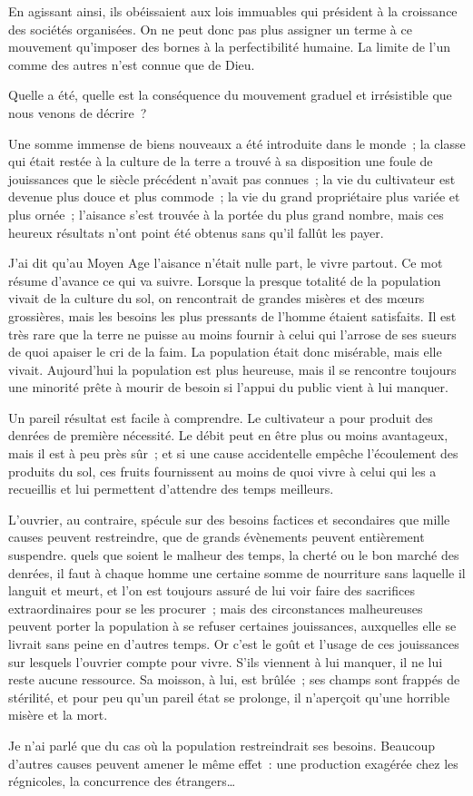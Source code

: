 \documentclass[twoside]{book} %
\begin{document}
\noindent En agissant ainsi, ils obéissaient aux lois immuables qui président à la croissance des sociétés organisées. On ne peut donc pas plus assigner un terme à ce mouvement qu’imposer des bornes à la perfectibilité humaine. La limite de l’un comme des autres n’est connue que de Dieu.\par
Quelle a été, quelle est la conséquence du mouvement graduel et irrésistible que nous venons de décrire ?\par
Une somme immense de biens nouveaux a été introduite dans le monde ; la classe qui était restée à la culture de la terre a trouvé à sa disposition une foule de jouissances que le siècle précédent n’avait pas connues ; la vie du cultivateur est devenue plus douce et plus commode ; la vie du grand propriétaire plus variée et plus ornée ; l’aisance s’est trouvée à la portée du plus grand nombre, mais ces heureux résultats n’ont point été obtenus sans qu’il fallût les payer.\par
J'ai dit qu’au Moyen Age l’aisance n’était nulle part, le vivre partout. Ce mot résume d’avance ce qui va suivre. Lorsque la presque totalité de la population vivait de la culture du sol, on rencontrait de grandes misères et des mœurs grossières, mais les besoins les plus pressants de l’homme étaient satisfaits. Il est très rare que la terre ne puisse au moins fournir à celui qui l’arrose de ses sueurs de quoi apaiser le cri de la faim. La population était donc misérable, mais elle vivait. Aujourd’hui la population est plus heureuse, mais il se rencontre toujours une minorité prête à mourir de besoin si l’appui du public vient à lui manquer.\par
Un pareil résultat est facile à comprendre. Le cultivateur a pour produit des denrées de première nécessité. Le débit peut en être plus ou moins avantageux, mais il est à peu près sûr ; et si une cause accidentelle empêche l’écoulement des produits du sol, ces fruits fournissent au moins de quoi vivre à celui qui les a recueillis et lui permettent d’attendre des temps meilleurs.\par
L'ouvrier, au contraire, spécule sur des besoins factices et secondaires que mille causes peuvent restreindre, que de grands évènements peuvent entièrement suspendre. quels que soient le malheur des temps, la cherté ou le bon marché des denrées, il faut à chaque homme une certaine somme de nourriture sans laquelle il languit et meurt, et l’on est toujours assuré de lui voir faire des sacrifices extraordinaires pour se les procurer ; mais des circonstances malheureuses peuvent porter la population à se refuser certaines jouissances, auxquelles elle se livrait sans peine en d’autres temps. Or c’est le goût et l’usage de ces jouissances sur lesquels l’ouvrier compte pour vivre. S'ils viennent à lui manquer, il ne lui reste aucune ressource. Sa moisson, à lui, est brûlée ; ses champs sont frappés de stérilité, et pour peu qu’un pareil état se prolonge, il n’aperçoit qu’une horrible misère et la mort.\par
Je n’ai parlé que du cas où la population restreindrait ses besoins. Beaucoup d’autres causes peuvent amener le même effet : une production exagérée chez les régnicoles, la concurrence des étrangers…\par
\end{document}
